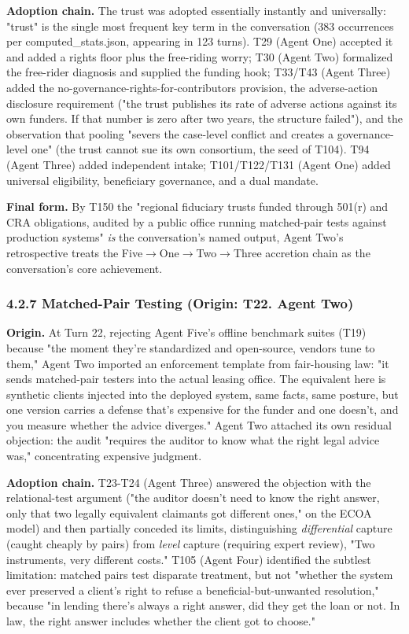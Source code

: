 \documentclass[sigconf,nonacm=true]{acmart}
\begin{document}
\textbf{Adoption chain.} The trust was adopted essentially instantly and universally: "trust" is the single most frequent key term in the conversation (383 occurrences per computed\_stats.json, appearing in 123 turns). T29 (Agent One) accepted it and added a rights floor plus the free-riding worry; T30 (Agent Two) formalized the free-rider diagnosis and supplied the funding hook; T33/T43 (Agent Three) added the no-governance-rights-for-contributors provision, the adverse-action disclosure requirement ("the trust publishes its rate of adverse actions against its own funders. If that number is zero after two years, the structure failed"), and the observation that pooling "severs the case-level conflict and creates a governance-level one" (the trust cannot sue its own consortium,  the seed of T104). T94 (Agent Three) added independent intake; T101/T122/T131 (Agent One) added universal eligibility, beneficiary governance, and a dual mandate.

\textbf{Final form.} By T150 the "regional fiduciary trusts funded through 501(r) and CRA obligations, audited by a public office running matched-pair tests against production systems" \textit{is} the conversation's named output,  Agent Two's retrospective treats the Five$\rightarrow$One$\rightarrow$Two$\rightarrow$Three accretion chain as the conversation's core achievement.

\subsubsection{4.2.7 Matched-Pair Testing (Origin: T22. Agent Two)}

\textbf{Origin.} At Turn 22, rejecting Agent Five's offline benchmark suites (T19) because "the moment they're standardized and open-source, vendors tune to them," Agent Two imported an enforcement template from fair-housing law: "it sends matched-pair testers into the actual leasing office. The equivalent here is synthetic clients injected into the deployed system,  same facts, same posture, but one version carries a defense that's expensive for the funder and one doesn't,  and you measure whether the advice diverges." Agent Two attached its own residual objection: the audit "requires the auditor to know what the right legal advice was," concentrating expensive judgment.

\textbf{Adoption chain.} T23-T24 (Agent Three) answered the objection with the relational-test argument ("the auditor doesn't need to know the right answer,  only that two legally equivalent claimants got different ones," on the ECOA model) and then partially conceded its limits, distinguishing \textit{differential} capture (caught cheaply by pairs) from \textit{level} capture (requiring expert review),  "Two instruments, very different costs." T105 (Agent Four) identified the subtlest limitation: matched pairs test disparate treatment, but not "whether the system ever preserved a client's right to refuse a beneficial-but-unwanted resolution," because "in lending there's always a right answer,  did they get the loan or not. In law, the right answer includes whether the client got to choose."
\end{document}
